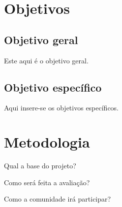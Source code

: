 \documentclass[12pt]{article}
\begin{document}
\section{Objetivos}

\subsection{Objetivo geral}
Este aqui é o objetivo geral.


\subsection{Objetivo específico}
Aqui insere-se os objetivos específicos.


















\section{Metodologia}

Qual a base do projeto?

Como será feita a avaliação?



Como a comunidade irá participar?













\end{document}
